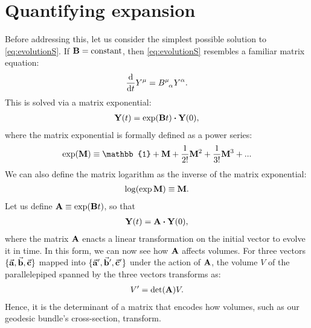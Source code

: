 \documentclass[10pt]{article}
\newcommand{\<}{\langle}
\renewcommand{\>}{\rangle}
\renewcommand{\(}{\left(}
\renewcommand{\)}{\right)}
\renewcommand{\[}{\left[}
\renewcommand{\]}{\right]}
\begin{document}
		\section{Quantifying expansion}
		Before addressing this, let us consider the simplest possible solution to \eqref{eq:evolutionS}. If $\vb{B}=\text{constant}$, then \eqref{eq:evolutionS} resembles a familiar matrix equation:
		\begin{align}
			\dv{t}Y^\mu = \tensor{B}{^\mu_\alpha} Y^\alpha.
		\end{align}
		This is solved via a matrix exponential:
		\begin{align}
			\vb{Y}(t) = \exp(\vb{B}t)\vdot\vb{Y}(0),
		\end{align}
		where the matrix exponential is formally defined as a power series:
		\begin{align}
			\exp(\vb{M}) \equiv \mathbb{1} + \vb{M} + \frac{1}{2!}\vb{M}^2 + \frac{1}{3!}\vb{M}^3 + ...
		\end{align}
		We can also define the matrix logarithm as the inverse of the matrix exponential:
		\begin{align}
			\log(\exp \vb{M}) \equiv \vb{M}.
		\end{align}
		Let us define $\vb{A} \equiv \exp(\vb{B} t)$, so that
		\begin{align}
			\vb{Y}(t) = \vb{A}\vdot\vb{Y}(0),
		\end{align}
		where the matrix $\vb{A}$ enacts a linear transformation on the initial vector to evolve it in time. In this form, we can now see how $\vb{A}$ affects volumes. For three vectors $\{ \va{a},\va{b},\va{c} \}$ mapped into $\{ \va{a}',\va{b}',\va{c}' \}$ under the action of $\vb{A}$, the volume $V$ of the parallelepiped spanned by the three vectors transforms as:
		\begin{align}
			V' = \det(\vb{A}) V.
		\end{align}
		Hence, it is the determinant of a matrix that encodes how volumes, such as our geodesic bundle's cross-section, transform.
		
\end{document}
